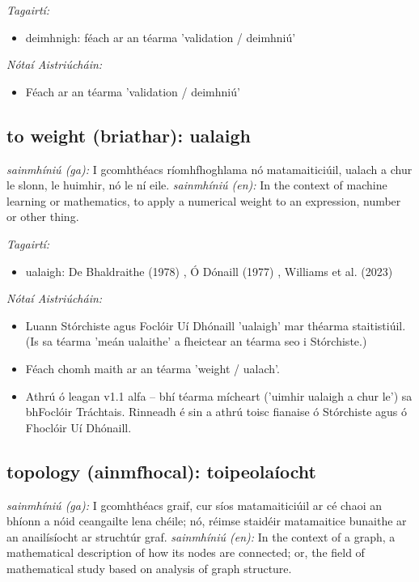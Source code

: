 \documentclass{article}
\begin{document}
 \noindent \textit{Tagairtí:}
\begin{itemize}
	\item deimhnigh: féach ar an téarma 'validation / deimhniú'
\end{itemize}

 \noindent \textit{Nótaí Aistriúcháin:}
\begin{itemize}
	\item Féach ar an téarma 'validation / deimhniú'
\end{itemize}


\subsection*{to weight (briathar): ualaigh} 
 \noindent \textit{sainmhíniú (ga):} I gcomhthéacs ríomhfhoghlama nó matamaiticiúil, ualach a chur le slonn, le huimhir, nó le ní eile.
\newline\newline
 \noindent \textit{sainmhíniú (en):} In the context of machine learning or mathematics, to apply a numerical weight to an expression, number or other thing.
\newline

 \noindent \textit{Tagairtí:}
\begin{itemize}
	\item ualaigh: De Bhaldraithe (1978) \cite{de-bhaldraithe}, Ó Dónaill (1977) \cite{odonaill}, Williams et al. (2023) \cite{storchiste}
\end{itemize}

 \noindent \textit{Nótaí Aistriúcháin:}
\begin{itemize}
	\item Luann Stórchiste agus Foclóir Uí Dhónaill 'ualaigh' mar théarma staitistiúil. (Is sa téarma 'meán ualaithe' a fheictear an téarma seo i Stórchiste.)
	\item Féach chomh maith ar an téarma 'weight / ualach'.
	\item Athrú ó leagan v1.1 alfa -- bhí téarma mícheart ('uimhir ualaigh a chur le') sa bhFoclóir Tráchtais. Rinneadh é sin a athrú toisc fianaise ó Stórchiste agus ó Fhoclóir Uí Dhónaill.
\end{itemize}


\subsection*{topology (ainmfhocal): toipeolaíocht} 
 \noindent \textit{sainmhíniú (ga):} I gcomhthéacs graif, cur síos matamaiticiúil ar cé chaoi an bhíonn a nóid ceangailte lena chéile; nó, réimse staidéir matamaitice bunaithe ar an anailísíocht ar struchtúr graf.
\newline\newline
 \noindent \textit{sainmhíniú (en):} In the context of a graph, a mathematical description of how its nodes are connected; or, the field of mathematical study based on analysis of graph structure.
\newline
\end{document}
